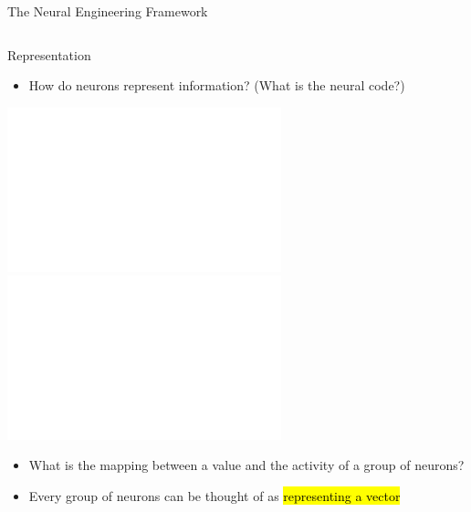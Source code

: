 \documentclass[handout,aspectratio=169]{beamer}
\begin{document}
\begin{frame}{The Neural Engineering Framework}
\begin{columns}
		\fboxrule=0.4pt\fboxsep=0pt
	\end{columns}
\end{frame}

\begin{frame}{Representation}
	\begin{itemize}
	\item How do neurons represent information? (What is the neural code?)
	\end{itemize}
	\vspace{0.25cm}
	\begin{overlayarea}{\textwidth}{6cm}
		\centering
		\includegraphics<2->[height=4.75cm]{media/hafting_et_al_2005_grid_cells.pdf}~~%
		\includegraphics<2->[height=4.75cm]{media/eliasmith_et_al_2003_orientation_tuning.pdf}\\
		\begin{itemize}
			\item<2-> What is the mapping between a value and the activity of a group of neurons?
			\item<3-> Every group of neurons can be thought of as \hl{representing a vector}
		\end{itemize}
	\end{overlayarea}
	\vspace{0.125cm}
\end{frame}
\end{document}
